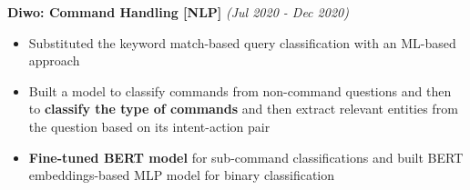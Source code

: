 \documentclass[a4paper,10pt]{article}
\newcommand{\isep}{-2 pt}
\begin{document}
\begin{itemize}
{{%


\item \textbf{Diwo: Command Handling [NLP]} \hfill {\emph{(Jul 2020 - Dec 2020)}}
    \\[-0.6cm]
    \begin{itemize}\itemsep \isep
    	\item Substituted the keyword match-based query classification with an ML-based approach
            \item Built a model to classify commands from non-command questions and then to \textbf{classify the type of commands} and then extract relevant entities from the question based on its intent-action pair
            \item \textbf{Fine-tuned BERT model} for sub-command classifications and built BERT embeddings-based MLP model for binary classification
        \\ [-0.5cm]
    \end{itemize}





}}
\end{itemize}
\end{document}
